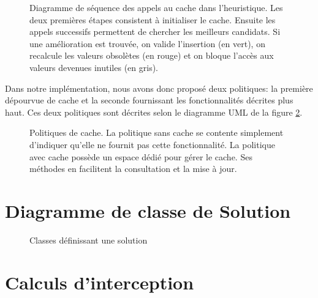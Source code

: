 	\begin{figure}[H]
		\centering
		\begin{tikzpicture}
			
		\end{tikzpicture}
		\caption[Diagramme de séquence des appels au cache dans l'heuristique]{Diagramme de séquence des appels au cache dans l'heuristique. {\scriptsize Les deux premières étapes consistent à initialiser le cache. Ensuite les appels successifs permettent de chercher les meilleurs candidats. Si une amélioration est trouvée, on valide l'insertion (en vert), on recalcule les valeurs obsolètes (en rouge) et on bloque l'accès aux valeurs devenues inutiles (en gris).}}
		\label{diag:cache}
	\end{figure}

	Dans notre implémentation, nous avons donc proposé deux politiques: la première dépourvue de cache et la seconde fournissant les fonctionnalités décrites plus haut. Ces deux politiques sont décrites selon le diagramme UML de la figure \ref{uml:cache_policies}.

	\begin{figure}[h]
		\centering
		\begin{tikzpicture}
						
		\end{tikzpicture}
		\caption[UML -- Politiques de cache]{Politiques de cache. {\scriptsize La politique sans cache se contente simplement d'indiquer qu'elle ne fournit pas cette fonctionnalité. La politique avec cache possède un espace dédié pour gérer le cache. Ses méthodes en facilitent la consultation et la mise à jour.}}
		\label{uml:cache_policies}
	\end{figure}

\chapter{Diagramme de classe de Solution}

	\begin{figure}[h!]
		\centering
		\begin{tikzpicture}
			
		\end{tikzpicture}
		\caption{Classes définissant une solution}
		\label{fig:solution-uml}
	\end{figure}
	
\chapter{Calculs d'interception}

